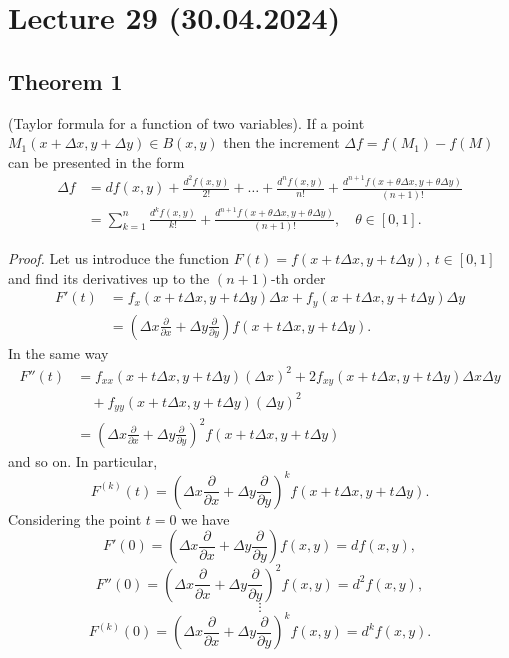 \documentclass{article}
\begin{document}
\section*{Lecture 29 (30.04.2024)}

\subsection*{Theorem 1}

\begin{theorem}
(Taylor formula for a function of two variables). If a point $M_1(x + \Delta x, y + \Delta y) \in B(x, y)$ then the increment $\Delta f = f(M_1) - f(M)$ can be presented in the form
\begin{align*}
\Delta f &= df(x, y) + \frac{d^2f(x, y)}{2!} + \dots + \frac{d^n f(x, y)}{n!} + \frac{d^{n+1}f(x + \theta \Delta x, y + \theta \Delta y)}{(n+1)!} \\
         &= \sum_{k=1}^{n} \frac{d^k f(x, y)}{k!} + \frac{d^{n+1}f(x + \theta \Delta x, y + \theta \Delta y)}{(n+1)!}, \quad \theta \in [0, 1].
\end{align*}
\end{theorem}

\vspace{1em}

\textit{Proof.} Let us introduce the function $F(t) = f(x + t\Delta x, y + t\Delta y)$, $t \in [0, 1]$ and find its derivatives up to the $(n+1)$-th order
\begin{align*}
F'(t) &= f_x(x + t\Delta x, y + t\Delta y)\Delta x + f_y(x + t\Delta x, y + t\Delta y)\Delta y \\
      &= \left(\Delta x \frac{\partial}{\partial x} + \Delta y \frac{\partial}{\partial y}\right) f(x + t\Delta x, y + t\Delta y).
\end{align*}
In the same way
\begin{align*}
F''(t) &= f_{xx}(x + t\Delta x, y + t\Delta y)(\Delta x)^2 + 2f_{xy}(x + t\Delta x, y + t\Delta y)\Delta x\Delta y \\
       &\quad + f_{yy}(x + t\Delta x, y + t\Delta y)(\Delta y)^2 \\
       &= \left(\Delta x \frac{\partial}{\partial x} + \Delta y \frac{\partial}{\partial y}\right)^2 f(x + t\Delta x, y + t\Delta y)
\end{align*}
and so on. In particular,
\[
F^{(k)}(t) = \left(\Delta x \frac{\partial}{\partial x} + \Delta y \frac{\partial}{\partial y}\right)^k f(x + t\Delta x, y + t\Delta y).
\]
Considering the point $t = 0$ we have
\[
F'(0) = \left(\Delta x \frac{\partial}{\partial x} + \Delta y \frac{\partial}{\partial y}\right) f(x, y) = df(x, y),
\]
\[
F''(0) = \left(\Delta x \frac{\partial}{\partial x} + \Delta y \frac{\partial}{\partial y}\right)^2 f(x, y) = d^2f(x, y),
\]
\[
\vdots
\]
\[
F^{(k)}(0) = \left(\Delta x \frac{\partial}{\partial x} + \Delta y \frac{\partial}{\partial y}\right)^k f(x, y) = d^k f(x, y).
\]
\end{document}
